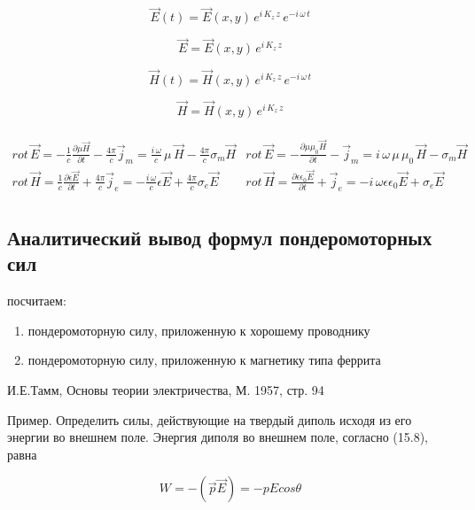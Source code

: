 \documentclass[11pt]{article}
\begin{document}
\[\vec{E}(t) = \vec{E}(x, y)\,e^{i\,K_z\,z}\,e^{-i\,\omega\,t}\]

\[\vec{E} = \vec{E}(x, y)\,e^{i\,K_z\,z}\]

    \[\vec{H}(t) = \vec{H}(x, y)\,e^{i\,K_z\,z}\,e^{-i\,\omega\,t}\]

\[\vec{H} = \vec{H}(x, y)\,e^{i\,K_z\,z}\]

    \[\begin{array}{c|c} \\
rot\,\vec{E} = -\frac{1}{c}\frac{\partial \mu \vec H}{\partial t} - \frac{4\pi}{c}\vec j_m = \frac{i\,\omega}{c}\,\mu\,\vec{H} - \frac{4\pi}{c}\sigma_m \vec H &
rot\,\vec{E} = -\frac{\partial \mu  \mu_0 \vec H}{\partial t} - \vec j_m = i\,\omega\,\mu\,\mu_0\,\vec{H} - \sigma_m \vec H \\
rot\,\vec{H} = \frac{1}{c}\frac{\partial \epsilon \vec E}{\partial t} + \frac{4\pi}{c} \vec j_e = - \frac{i\,\omega}{c} \epsilon \vec{E} + \frac{4\pi}{c}\sigma_e \vec E &
rot\,\vec{H} = \frac{\partial \epsilon \epsilon_0 \vec E}{\partial t} + \vec j_e = - i\,\omega \epsilon \epsilon_0 \vec{E} + \sigma_e \vec E \\
\end{array}\]

    \subsection{Аналитический вывод формул пондеромоторных
сил}\label{ux430ux43dux430ux43bux438ux442ux438ux447ux435ux441ux43aux438ux439-ux432ux44bux432ux43eux434-ux444ux43eux440ux43cux443ux43b-ux43fux43eux43dux434ux435ux440ux43eux43cux43eux442ux43eux440ux43dux44bux445-ux441ux438ux43b}

    посчитаем:

\begin{enumerate}
\def\labelenumi{\arabic{enumi})}
\item
  пондеромоторную силу, приложенную к хорошему проводнику
\item
  пондеромоторную силу, приложенную к магнетику типа феррита
\end{enumerate}

    И.Е.Тамм, Основы теории электричества, М. 1957, стр. 94

Пример. Определить силы, действующие на твердый диполь исходя из его
энергии во внешнем поле. Энергия диполя во внешнем поле, согласно
(15.8), равна

\[W = -\left(\vec {p} \vec{E} \right) = -p E cos \theta\]
\end{document}
